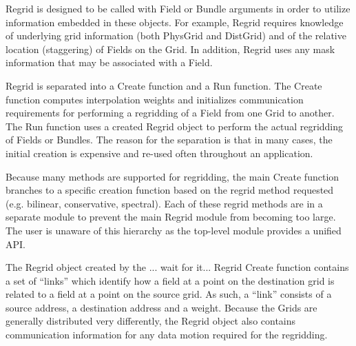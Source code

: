 Regrid is designed to be called with Field or Bundle
arguments in order to utilize information embedded in
these objects.  For example, Regrid requires knowledge
of underlying grid information (both PhysGrid and DistGrid)
and of the relative location (staggering) of Fields on
the Grid.  In addition, Regrid uses any mask information
that may be associated with a Field.

Regrid is separated into a Create function and a
Run function. The Create function computes
interpolation weights and initializes communication
requirements for performing a regridding of a Field
from one Grid to another.  The Run function uses
a created Regrid object to perform the actual regridding
of Fields or Bundles.  The reason for the separation
is that in many cases, the initial creation is
expensive and re-used often throughout an application.

Because many methods are supported for regridding,
the main Create function branches to a specific
creation function based on the regrid method requested
(e.g. bilinear, conservative, spectral).  Each of
these regrid methods are in a separate module to
prevent the main Regrid module from becoming too
large.  The user is unaware of this hierarchy as the
top-level module provides a unified API.

The Regrid object created by the ... wait for it...
Regrid Create function contains a set of ``links''
which identify how a field at a point on the
destination grid is related to a field at a
point on the source grid.  As such, a ``link''
consists of a source address, a destination address
and a weight.  Because the Grids are generally
distributed very differently, the Regrid object
also contains communication information
for any data motion required for the regridding.

